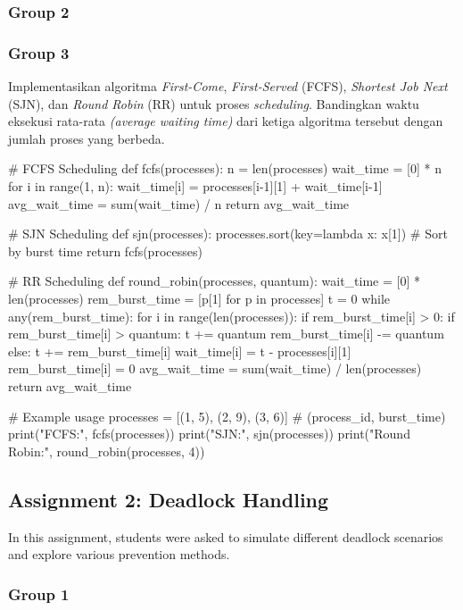 \documentclass[12pt]{article}
\begin{document}
\subsubsection{Group 2}
\subsubsection{Group 3}
Implementasikan algoritma \textit{First-Come}, \textit{First-Served} (FCFS), \textit{Shortest Job Next} (SJN), dan \textit{Round Robin} (RR) untuk proses \textit{scheduling}. Bandingkan waktu eksekusi rata-rata \textit{(average waiting time)} dari ketiga algoritma tersebut dengan jumlah proses yang berbeda.
\begin{python}
    # FCFS Scheduling
def fcfs(processes):
    n = len(processes)
    wait_time = [0] * n
    for i in range(1, n):
        wait_time[i] = processes[i-1][1] + wait_time[i-1]
    avg_wait_time = sum(wait_time) / n
    return avg_wait_time

# SJN Scheduling
def sjn(processes):
    processes.sort(key=lambda x: x[1])  # Sort by burst time
    return fcfs(processes)

# RR Scheduling
def round_robin(processes, quantum):
    wait_time = [0] * len(processes)
    rem_burst_time = [p[1] for p in processes]
    t = 0
    while any(rem_burst_time):
        for i in range(len(processes)):
            if rem_burst_time[i] > 0:
                if rem_burst_time[i] > quantum:
                    t += quantum
                    rem_burst_time[i] -= quantum
                else:
                    t += rem_burst_time[i]
                    wait_time[i] = t - processes[i][1]
                    rem_burst_time[i] = 0
    avg_wait_time = sum(wait_time) / len(processes)
    return avg_wait_time

# Example usage
processes = [(1, 5), (2, 9), (3, 6)]  # (process_id, burst_time)
print("FCFS:", fcfs(processes))
print("SJN:", sjn(processes))
print("Round Robin:", round_robin(processes, 4))

\end{python}

\subsection{Assignment 2: Deadlock Handling}
In this assignment, students were asked to simulate different deadlock scenarios and explore various prevention methods.
\subsubsection{Group 1}
\end{document}
